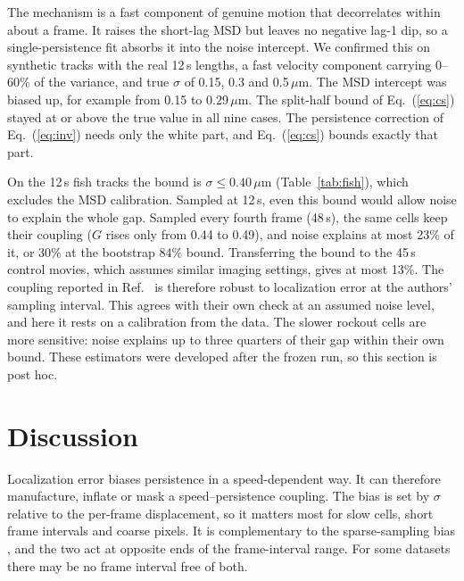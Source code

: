 \documentclass[aps,pre,10pt,twocolumn,superscriptaddress,amsmath,amssymb,floatfix]{revtex4-2}
\begin{document}
The mechanism is a fast component of genuine motion that decorrelates within about a frame. It raises the short-lag MSD but leaves no negative lag-1 dip, so a single-persistence fit absorbs it into the noise intercept. We confirmed this on synthetic tracks with the real 12\,s lengths, a fast velocity component carrying 0--60\% of the variance, and true $\sigma$ of 0.15, 0.3 and 0.5\,$\mu$m. The MSD intercept was biased up, for example from 0.15 to 0.29\,$\mu$m. The split-half bound of Eq.~(\ref{eq:cs}) stayed at or above the true value in all nine cases. The persistence correction of Eq.~(\ref{eq:inv}) needs only the white part, and Eq.~(\ref{eq:cs}) bounds exactly that part.

On the 12\,s fish tracks the bound is $\sigma\le0.40$\,$\mu$m (Table~\ref{tab:fish}), which excludes the MSD calibration. Sampled at 12\,s, even this bound would allow noise to explain the whole gap. Sampled every fourth frame (48\,s), the same cells keep their coupling ($G$ rises only from 0.44 to 0.49), and noise explains at most 23\% of it, or 30\% at the bootstrap 84\% bound. Transferring the bound to the 45\,s control movies, which assumes similar imaging settings, gives at most 13\%. The coupling reported in Ref.~\cite{Jerison2020} is therefore robust to localization error at the authors' sampling interval. This agrees with their own check at an assumed noise level, and here it rests on a calibration from the data. The slower rockout cells are more sensitive: noise explains up to three quarters of their gap within their own bound. These estimators were developed after the frozen run, so this section is post hoc.

\section{Discussion}

Localization error biases persistence in a speed-dependent way. It can therefore manufacture, inflate or mask a speed--persistence coupling. The bias is set by $\sigma$ relative to the per-frame displacement, so it matters most for slow cells, short frame intervals and coarse pixels. It is complementary to the sparse-sampling bias \cite{Ganusov2023}, and the two act at opposite ends of the frame-interval range. For some datasets there may be no frame interval free of both.
\end{document}

